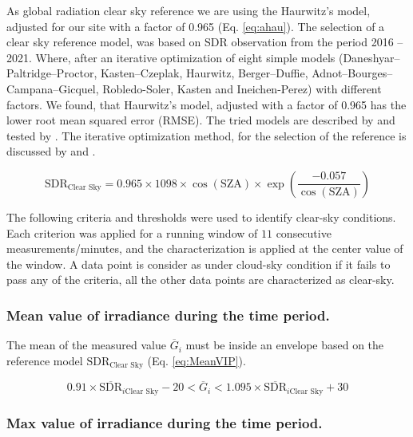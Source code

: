 \documentclass[preprint, 3p,
authoryear]{elsarticle} %
\begin{document}
As global radiation clear sky reference we are using the Haurwitz's
model, adjusted for our site with a factor of 0.965 (Eq. \ref{eq:ahau}).
The selection of a clear sky reference model, was based on SDR
observation from the period 2016 -- 2021. Where, after an iterative
optimization of eight simple models (Daneshyar--Paltridge--Proctor,
Kasten--Czeplak, Haurwitz, Berger--Duffie,
Adnot--Bourges--Campana--Gicquel, Robledo-Soler, Kasten and
Ineichen-Perez) with different factors. We found, that Haurwitz's model,
adjusted with a factor of 0.965 has the lower root mean squared error
(RMSE). The tried models are described by \citet{Reno2012} and tested by
\citet{Reno2016}. The iterative optimization method, for the selection
of the reference is discussed by \citet{Long2000} and \citet{Reno2016}.

\begin{equation}
\text{SDR}_\text{Clear Sky} = 0.965 \times 1098 \times \cos( \text{SZA} ) \times \exp \left( \frac{ - 0.057}{\cos(\text{SZA})} \right) \label{eq:ahau}
\end{equation}

The following criteria and thresholds were used to identify clear-sky
conditions. Each criterion was applied for a running window of \(11\)
consecutive measurements/minutes, and the characterization is applied at
the center value of the window. A data point is consider as under
cloud-sky condition if it fails to pass any of the criteria, all the
other data points are characterized as clear-sky.

\hypertarget{mean-value-of-irradiance-during-the-time-period.}{%
\subsubsection{Mean value of irradiance during the time
period.}\label{mean-value-of-irradiance-during-the-time-period.}}

The mean of the measured value \(\overline{G}_i\) must be inside an
envelope based on the reference model \(\text{SDR}_\text{Clear Sky}\)
(Eq. \ref{eq:MeanVIP}).

\begin{equation}
0.91 \times \overline{\text{SDR}}_{i\text{Clear Sky}} - 20
< \overline{G}_i <
1.095 \times \overline{\text{SDR}}_{i\text{Clear Sky}} + 30
\label{eq:MeanVIP}
\end{equation}

\hypertarget{max-value-of-irradiance-during-the-time-period.}{%
\subsubsection{Max value of irradiance during the time
period.}\label{max-value-of-irradiance-during-the-time-period.}}
\end{document}

